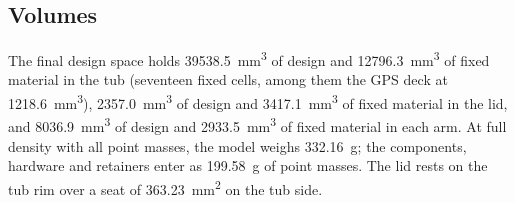 \subsection{Volumes}

The final design space holds \SI{39538.5}{mm^3} of design and \SI{12796.3}{mm^3} of fixed material in the tub (seventeen fixed cells, among them the GPS deck at \SI{1218.6}{mm^3}), \SI{2357.0}{mm^3} of design and \SI{3417.1}{mm^3} of fixed material in the lid, and \SI{8036.9}{mm^3} of design and \SI{2933.5}{mm^3} of fixed material in each arm. At full density with all point masses, the model weighs \SI{332.16}{g}; the components, hardware and retainers enter as \SI{199.58}{g} of point masses. The lid rests on the tub rim over a seat of \SI{363.23}{mm^2} on the tub side.
